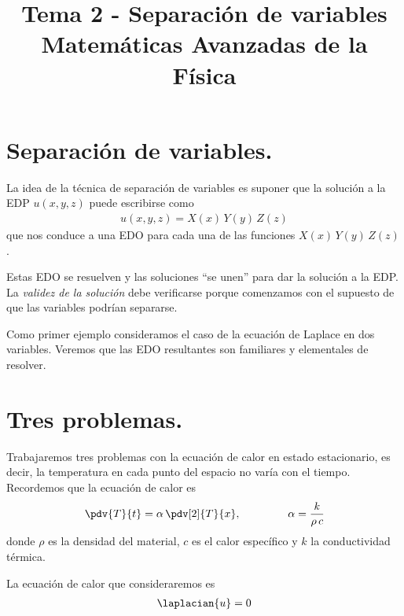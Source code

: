 
\title{Tema 2 - Separación de variables \\ {\large Matemáticas Avanzadas de la Física}\vspace{-1.5\baselineskip}}
\author{}
\date{ }

\maketitle
\fontsize{14}{14}\selectfont
\section{Separación de variables.}
La idea de la técnica de separación de variables es suponer que la solución a la EDP $u (x, y, z)$ puede escribirse como
\begin{align*}
u (x, y ,z) =  X(x) \, Y(y) \, Z(z)
\end{align*}
que nos conduce a una EDO para cada una de las funciones $X(x) \, Y(y) \, Z(z)$.
\par
Estas EDO se resuelven y las soluciones \enquote{se unen} para dar la solución a la EDP. La \emph{validez de la solución} debe verificarse porque comenzamos con el supuesto de que las variables podrían separarse.
\par
Como primer ejemplo consideramos el caso de la ecuación de Laplace en dos variables. Veremos que las EDO resultantes son familiares y elementales de resolver.
\section{Tres problemas.}
Trabajaremos tres problemas con la ecuación de calor en estado estacionario, es decir, la temperatura en cada punto del espacio no varía con el tiempo. Recordemos que la ecuación de calor es
\begin{align}
\pdv{T}{t} = \alpha \, \pdv[2]{T}{x}, \hspace{1.5cm} \alpha = \dfrac{k}{\rho \, c}
\label{eq:ecuacion_001}    
\end{align}
donde $\rho$ es la densidad del material, $c$ es el calor específico y $k$ la conductividad térmica.
\par
La ecuación de calor que consideraremos es
\begin{align}
\laplacian{u} = 0
\label{eq:ecuacion_002}    
\end{align}
